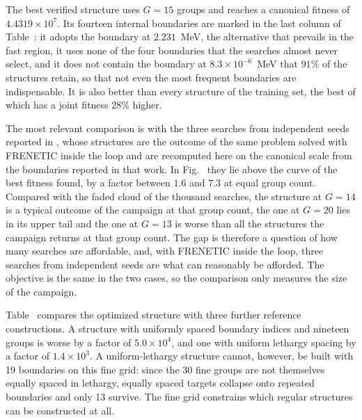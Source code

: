 The best verified structure uses $G=15$ groups and reaches a canonical fitness
of $4.4319\times10^{7}$. Its fourteen internal boundaries are marked in the last
column of Table~: it adopts the boundary at $2.231$~MeV,
the alternative that prevails in the fast region, it uses none of the four
boundaries that the searches almost never select, and it does not contain the
boundary at $8.3\times10^{-6}$~MeV that $91\%$ of the structures retain, so
that not even the most frequent boundaries are indispensable. It is also better
than every structure of the training set, the best of which has a joint fitness
$28\%$ higher.

The most relevant comparison is with the three searches from independent
seeds reported in \citet{prevMulti}, whose structures are the outcome of the
same problem solved with FRENETIC inside the loop and are recomputed here on
the canonical scale from the boundaries reported in that work. In
Fig.~ they lie above the curve of the best fitness found,
by a factor between $1.6$ and $7.3$ at equal group count. Compared with the
faded cloud of the thousand searches, the structure at $G=14$ is a typical
outcome of the campaign at that group count, the one at $G=20$ lies in its
upper tail and the one at $G=13$ is worse than all the structures the campaign
returns at that group count. The gap is therefore a question of how many
searches are affordable, and, with FRENETIC inside the loop, three searches from
independent seeds are what can reasonably be afforded. The objective is the same in the two
cases, so the comparison only measures the size of the campaign.

Table~ compares the optimized structure with three further
reference constructions. A structure with uniformly spaced boundary indices and
nineteen groups is worse by a factor of $5.0\times10^{4}$, and one with uniform
lethargy spacing by a factor of $1.4\times10^{3}$. A uniform-lethargy structure
cannot, however, be built with 19 boundaries on this fine grid: since the 30
fine groups are not themselves equally spaced in lethargy, equally spaced
targets collapse onto repeated boundaries and only 13 survive.
The fine grid constrains which regular structures can be constructed at all.

